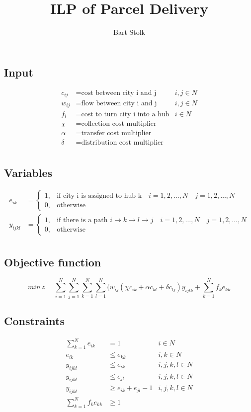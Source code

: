 \documentclass[11pt]{article} %
\title{ILP of Parcel Delivery}
\author{Bart Stolk}
\begin{document}
\maketitle

\subsection*{Input}
\begin{align*}
c_{ij} &= \text{cost between city i and j}  &i,j \in N\\
w_{ij} &= \text{flow between city i and j} &i,j \in N\\
f_{i} &= \text{cost to turn city i into a hub} &i \in N\\
\chi &= \text{collection cost multiplier} \\
\alpha &= \text{transfer cost multiplier} \\
\delta &= \text{distribution cost multiplier} \\
\end{align*}

\subsection*{Variables}
\begin{align*}
e_{ik} &=
\begin{cases} 
1, & \text{if city i is assigned to hub k} \quad i=1,2,\ldots,N \quad j=1,2,\ldots,N  \\ 
0, & \text{otherwise} 
\end{cases} \\
y_{ijkl} &=
\begin{cases} 
1, & \text{if there is a path } i \rightarrow k \rightarrow l \rightarrow j \quad i=1,2,\ldots,N \quad j=1,2,\ldots,N  \\ 
0, & \text{otherwise} 
\end{cases} \\
\end{align*}

\subsection*{Objective function}
$$min\,z=\sum^N_{i=1}\sum^N_{j=1}\sum^N_{k=1}\sum^N_{l=1}(w_{ij}(\chi c_{ik}+\alpha c_{kl}+\delta c_{lj})y_{ijlk} + \sum^N_{k=1}f_{k}e_{kk}$$

\subsection*{Constraints}
\begin{align*}
\sum^N_{k=1}e_{ik} &= 1 &i \in N \\
e_{ik} & \leq e_{kk} &i,k \in N \\
y_{ijkl} &\leq e_{ik} &i,j,k,l \in N \\
y_{ijkl} &\leq e_{jl} &i,j,k,l \in N \\
y_{ijkl} &\geq e_{ik} + e_{jl} - 1 &i,j,k,l \in N \\
\sum^N_{k=1}f_k e_{kk} &\geq 1
\end{align*}
\end{document}

